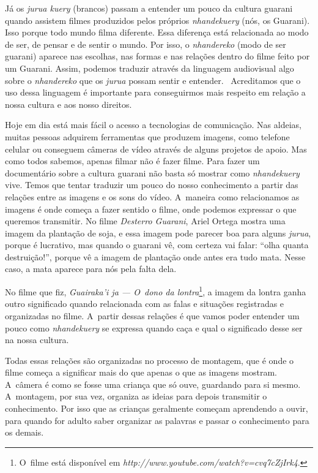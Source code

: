 Já os \emph{jurua kuery} (brancos) passam a entender um pouco da cultura
guarani quando assistem filmes produzidos pelos próprios \emph{nhandekuery}
(nós, os Guarani). Isso porque todo mundo filma diferente. Essa
diferença está relacionada ao modo de ser, de pensar e de sentir o
mundo. Por isso, o \emph{nhandereko} (modo de ser guarani) aparece nas
escolhas, nas formas e nas relações dentro do filme feito por um
Guarani. Assim, podemos traduzir através da linguagem audiovisual algo
sobre o \emph{nhandereko} que os \emph{jurua} possam sentir e entender.~ Acreditamos
que o uso dessa linguagem é importante para conseguirmos mais respeito
em relação a nossa cultura e aos nosso direitos.

Hoje em dia está mais fácil o acesso a tecnologias de comunicação. Nas
aldeias, muitas pessoas adquirem ferramentas que produzem imagens, como
telefone celular ou conseguem câmeras de vídeo através de alguns
projetos de apoio. Mas como todos sabemos, apenas filmar não é fazer
filme. Para fazer um documentário sobre a cultura guarani não basta só
mostrar como \emph{nhandekuery} vive. Temos que tentar traduzir um pouco do
nosso conhecimento a partir das relações entre as imagens e os sons do
vídeo. A~maneira como relacionamos as imagens é onde começa a fazer
sentido o filme, onde podemos expressar o que queremos transmitir. No
filme \emph{Desterro Guarani}, Ariel Ortega mostra uma imagem da plantação de
soja, e essa imagem pode parecer boa para alguns \emph{jurua}, porque é
lucrativo, mas quando o guarani vê, com certeza vai falar: ``olha quanta
destruição!'', porque vê a imagem de plantação onde antes era tudo mata.
Nesse caso, a mata aparece para nós pela falta dela. 

No filme que fiz, \emph{Guairaka’i ja --- O~dono da lontra}\footnote{O~filme está
disponível em \emph{http://www.youtube.com/watch?v=cvq7cZjIrk4}.},
a imagem da lontra ganha outro significado quando relacionada com as
falas e situações registradas e organizadas no filme. A~partir dessas
relações é que vamos poder entender um pouco como \emph{nhandekuery} se
expressa quando caça e qual o significado desse ser na nossa cultura. 

Todas essas relações são organizadas no processo de montagem, que é onde
o filme começa a significar mais do que apenas o que as imagens
mostram. A~câmera é como se fosse uma criança que só ouve, guardando
para si mesmo. A~montagem, por sua vez, organiza as ideias para depois
transmitir o conhecimento. Por isso que as crianças geralmente começam
aprendendo a ouvir, para quando for adulto saber organizar as palavras
e passar o conhecimento para os demais.

